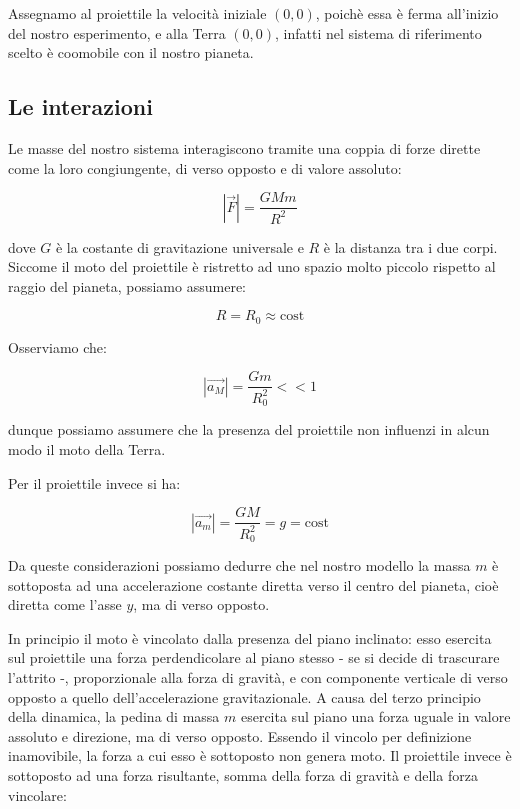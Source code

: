 \documentclass{article}
\begin{document}
Assegnamo al proiettile la velocità iniziale $(0,0)$, poichè essa è ferma
all'inizio del nostro esperimento, e alla Terra $(0,0)$, infatti
nel sistema di riferimento scelto è coomobile con il nostro pianeta.

\subsection{Le interazioni}
Le masse del nostro sistema interagiscono tramite una coppia di forze dirette
come la loro congiungente, di verso opposto e di valore assoluto:

\begin{equation}
|\vec{F}| = \frac{G M m}{R^2}
\end{equation}

dove $G$ è la costante di gravitazione universale e $R$ è la distanza tra i due
corpi. Siccome il moto del proiettile è ristretto ad uno spazio
molto piccolo rispetto al raggio del pianeta, possiamo assumere:

\begin{equation}
R = R_0 \approx \mbox{cost}
\end{equation}

Osserviamo che:

\begin{equation}
|\vec{a_M}| = \frac{Gm}{R_0^2} << 1
\end{equation}

dunque possiamo assumere che la presenza del proiettile non influenzi in alcun
modo il moto della Terra.

Per il proiettile invece si ha:

\begin{equation}
|\vec{a_m}| = \frac{GM}{R_0^2} = g = \mbox{cost}
\end{equation}

Da queste considerazioni possiamo dedurre che nel nostro modello
la massa $m$ è sottoposta ad una accelerazione costante
diretta verso il centro del pianeta, cioè diretta come l'asse $y$,
ma di verso opposto.

In principio il moto è vincolato dalla presenza del piano inclinato:
esso esercita sul proiettile una forza perdendicolare al piano stesso
- se si decide di trascurare l'attrito -, proporzionale alla forza di
gravità, e con componente verticale di verso opposto a quello
dell'accelerazione gravitazionale. A causa del terzo principio della
dinamica, la pedina di massa $m$ esercita sul piano una forza uguale in
valore assoluto e direzione, ma di verso opposto. Essendo il vincolo
per definizione inamovibile, la forza a cui esso è sottoposto non genera
moto. Il proiettile invece è sottoposto ad una forza risultante, somma
della forza di gravità e della forza vincolare: 
\end{document}

